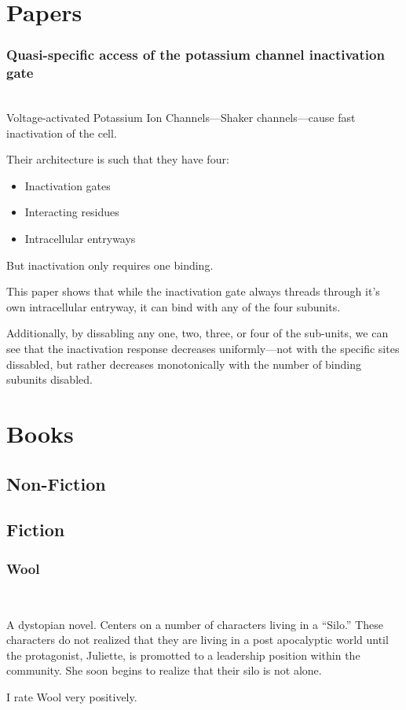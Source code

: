 \documentclass[12pt]{article}
\newenvironment{annotatedcitation}[2]%
{\bigskip \subsubsection*{#1}  \fullcite{#2} \\ \smallskip \noindent}%
{\bigskip}
\begin{document}
\section{Papers}

  \begin{annotatedcitation}{Quasi-speciﬁc access of the potassium channel inactivation gate}{Venkataraman14}
    Voltage-activated Potassium Ion Channels---Shaker channels---cause
    fast inactivation of the cell.

    Their architecture is such that they have four:

    \begin{itemize}
      \item Inactivation gates
      \item Interacting residues
      \item Intracellular entryways
    \end{itemize}

    But inactivation only requires one binding.

    This paper shows that while the inactivation gate always threads
    through it's own intracellular entryway, it can bind with any of
    the four subunits.

    Additionally, by dissabling any one, two, three, or four of the
    sub-units, we can see that the inactivation response decreases
    uniformly---not with the specific sites dissabled, but rather
    decreases monotonically with the number of binding subunits
    disabled.

  \end{annotatedcitation}

\section{Books}

\subsection{Non-Fiction}

\subsection{Fiction}

  \begin{annotatedcitation}{Wool}{howey12}

    A dystopian novel. Centers on a number of characters living in a
    ``Silo.'' These characters do not realized that they are living in a
    post apocalyptic world until the protagonist, Juliette, is promotted
    to a leadership position within the community. She soon begins to
    realize that their silo is not alone.

    I rate Wool very positively.
  \end{annotatedcitation}
\end{document}
